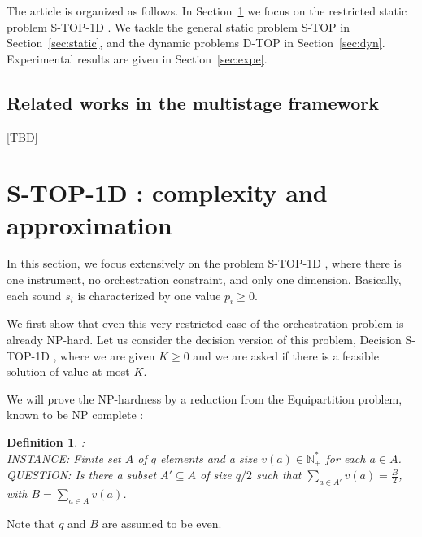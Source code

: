 \documentclass[a4paper]{book}
\newtheorem{definition}{Definition}
\newcommand{\stat}{{\sc S-TOP }}
\newcommand{\statoned}{{\sc S-TOP-1D }}
\newcommand{\dyn}{{\sc D-TOP }}
\begin{document}
The article is organized as follows. In Section~\ref{sec:1dnoc} we focus on the restricted static problem \statoned. We tackle the general static problem \stat in Section~\ref{sec:static}, and the dynamic problems \dyn in Section~\ref{sec:dyn}. Experimental results are given in Section~\ref{sec:expe}. 


\subsection{Related works in the {\sc multistage} framework}

[TBD] 






\section{\statoned: complexity and approximation}\label{sec:1dnoc}

In this section, we focus extensively on the problem \statoned, where there is one instrument, no orchestration constraint, and only one dimension. Basically, each sound $s_i$ is characterized by one value $p_i\geq 0$. 

We first show that even this very restricted case of the orchestration problem is already NP-hard. Let us consider the decision version of this problem, {\sc Decision} \statoned, where we are given $K\geq 0$ and we are asked if there is a feasible solution of value at most $K$. 




We will prove the NP-hardness by a reduction from the {\sc Equipartition} problem,  known to be {\sc NP} complete \cite{gj}:

\begin{definition} { }:\\
INSTANCE: Finite set $A$ of $q$ elements and a size $v(a) \in \mathbb{N_+^*}$ for each $a \in A$.\\
QUESTION: Is there a subset $A' \subseteq A$ of size $q/2$ such that $\sum_{a \in A'}v(a)=\frac{B}{2}$, with $B=\sum_{a \in A }v(a)$.
\end{definition}
Note that $q$ and $B$ are assumed to be even. 
\end{document}
